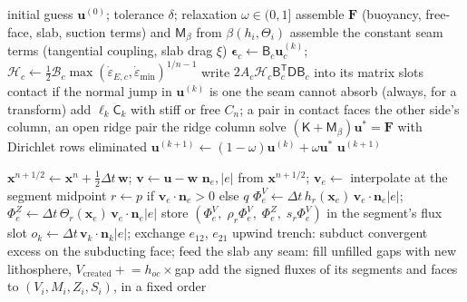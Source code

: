 \documentclass[11pt]{article}
\newcommand{\vect}[1]{\mathbf{#1}}
\newcommand{\edot}{\dot{\varepsilon}}
\newcommand{\Hint}{\mathcal{H}}
\newcommand{\Bint}{\mathcal{B}}
\begin{document}
\begin{algorithm}[H]
\caption{\textsc{SolveVelocity}: Picard iteration}\label{alg:solve}
\begin{algorithmic}[1]
\Require initial guess $\vect{u}^{(0)}$; tolerance $\delta$; relaxation $\omega\in(0,1]$
\State assemble $\vect{F}$ (buoyancy, free-face, slab, suction terms) and $\mathsf{M}_\beta$ from $\beta(h_i,\Theta_i)$
\State assemble the constant seam terms (tangential coupling, slab drag $\xi$)
    \State $\boldsymbol\epsilon_c\gets\mathsf{B}_c\vect{u}_c^{(k)}$; $\Hint_c\gets\tfrac12\Bint_c\max(\edot_{E,c},\edot_{\min})^{1/n-1}$
    \State write $2A_c\Hint_c\mathsf{B}_c^{\mathsf T}\mathsf{D}\mathsf{B}_c$ into its matrix slots
  \EndFor
    \State contact if the normal jump in $\vect{u}^{(k)}$ is one the seam cannot absorb (always, for a transform)
    \State add $\ell_k\mathsf{C}_k$ with stiff or free $C_n$; a pair in contact faces the other side's column, an open ridge pair the ridge column
  \EndFor
  \State solve $(\mathsf{K}+\mathsf{M}_\beta)\vect{u}^\ast=\vect{F}$ with Dirichlet rows eliminated
  \State $\vect{u}^{(k+1)}\gets(1-\omega)\vect{u}^{(k)}+\omega\vect{u}^\ast$
  \If{$\|\vect{u}^{(k+1)}-\vect{u}^{(k)}\|\le\delta\|\vect{u}^{(k+1)}\|$} \Return $\vect{u}^{(k+1)}$ \EndIf
\EndFor
\end{algorithmic}
\end{algorithm}

\begin{algorithm}[H]
\caption{\textsc{FluxUpdate}: conservative ALE transport}\label{alg:flux}
\begin{algorithmic}[1]
\State $\vect{x}^{n+1/2}\gets\vect{x}^n+\tfrac12\Delta t\,\vect{w}$; $\vect{v}\gets\vect{u}-\vect{w}$
  \State $\vect{n}_e,|e|$ from $\vect{x}^{n+1/2}$; $\vect{v}_e\gets$ interpolate at the segment midpoint
  \State $r\gets p$ if $\vect{v}_e\cdot\vect{n}_e>0$ else $q$
  \State $\Phi^{V}_e\gets\Delta t\,h_r(\vect{x}_e)\,\vect{v}_e\cdot\vect{n}_e|e|$; $\Phi^{Z}_e\gets\Delta t\,\Theta_r(\vect{x}_e)\,\vect{v}_e\cdot\vect{n}_e|e|$
  \State store $(\Phi^V_e,\;\rho_r\Phi^V_e,\;\Phi^Z_e,\;s_r\Phi^V_e)$ in the segment's flux slot
\EndFor
{}
  \State $o_k\gets\Delta t\,\vect{v}_k\cdot\vect{n}_k|e|$; exchange $e_{12}$, $e_{21}$ upwind
  \State trench: subduct convergent excess on the subducting face; feed the slab
  \State any seam: fill unfilled gaps with new lithosphere, $V_{\mathrm{created}}\mathrel{+}=h_{oc}\times$gap
\EndFor
{}
  \State add the signed fluxes of its segments and faces to $(V_i,M_i,Z_i,S_i)$, in a fixed order
\EndFor
\end{algorithmic}
\end{algorithm}
\end{document}
